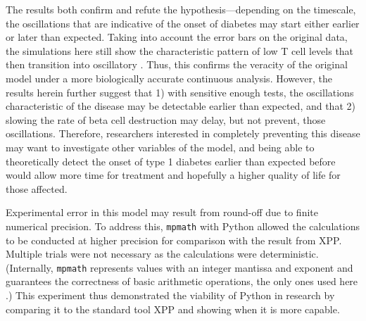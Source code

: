 The results both confirm and refute the hypothesis—depending on the
timescale, the oscillations that are indicative of the onset of diabetes may
start either earlier or later than expected. Taking into account the error
bars on the original data, the simulations here still show the
characteristic pattern of low T cell levels that then transition into
oscillatory . Thus, this confirms the veracity of the
original model under a more biologically accurate continuous
analysis. However, the results herein further suggest that 1) with sensitive
enough tests, the oscillations characteristic of the disease may be
detectable earlier than expected, and that 2) slowing the rate of beta cell
destruction may delay, but not prevent, those oscillations. Therefore,
researchers interested in completely preventing this disease may want to
investigate other variables of the model, and being able to theoretically
detect the onset of type 1 diabetes earlier than expected before would allow
more time for treatment and hopefully a higher quality of life for those
affected.

Experimental error in this model may result from round-off due to finite
numerical precision. To address this, {\tt mpmath} with Python allowed the
calculations to be conducted at higher precision for comparison with the
result from XPP. Multiple trials were not necessary as the calculations were
deterministic. (Internally, {\tt mpmath} represents values with an integer
mantissa and exponent and guarantees the correctness of basic
arithmetic operations, the only ones used here \cite{Mpmath2013}.) This
experiment thus demonstrated the viability of Python in research by
comparing it to the standard tool XPP and showing when it is more capable.
